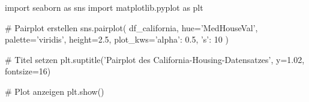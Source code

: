 import seaborn as sns
import matplotlib.pyplot as plt

# Pairplot erstellen
sns.pairplot(
    df_california,
    hue='MedHouseVal',
    palette='viridis',
    height=2.5,
    plot_kws={'alpha': 0.5, 's': 10}
)

# Titel setzen
plt.suptitle('Pairplot des California-Housing-Datensatzes', y=1.02, fontsize=16)

# Plot anzeigen
plt.show()